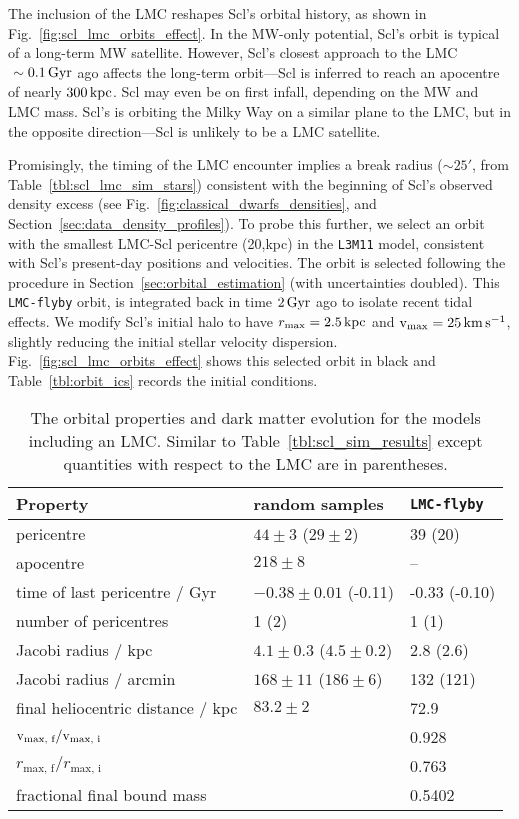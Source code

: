 The inclusion of the LMC reshapes Scl's orbital history, as shown in
Fig.~\ref{fig:scl_lmc_orbits_effect}. In the MW-only potential, Scl's
orbit is typical of a long-term MW satellite. However, Scl's closest
approach to the LMC \(~\sim0.1\,{\rm Gyr}\) ago affects the long-term
orbit---Scl is inferred to reach an apocentre of nearly \(300\,{\rm kpc}\).
Scl may even be on first infall, depending on the MW and LMC mass. Scl's
is orbiting the Milky Way on a similar plane to the LMC, but in the
opposite direction---Scl is unlikely to be a LMC satellite.

Promisingly, the timing of the LMC encounter implies a break radius
(\(\sim 25'\), from Table~\ref{tbl:scl_lmc_sim_stars}) consistent with
the beginning of Scl's observed density excess (see
Fig.~\ref{fig:classical_dwarfs_densities}, and
Section~\ref{sec:data_density_profiles}). To probe this further, we
select an orbit with the smallest LMC-Scl pericentre (20,kpc) in the
\texttt{L3M11} model, consistent with Scl's present-day positions and
velocities. The orbit is selected following the procedure in
Section~\ref{sec:orbital_estimation} (with uncertainties doubled). This
\texttt{LMC-flyby} orbit, is integrated back in time \(2\,{\rm Gyr}\) ago to
isolate recent tidal effects. We modify Scl's initial halo to have
\(r_{\rm max} = 2.5\,{\rm kpc}\) and \({\rm v}_{\rm max} = 25\,{\rm km\,s^{-1}}\), slightly reducing the
initial stellar velocity dispersion.
Fig.~\ref{fig:scl_lmc_orbits_effect} shows this selected orbit in black
and Table~\ref{tbl:orbit_ics} records the initial conditions.

\begin{table*}[t]
\centering
\caption[Orbits and results for Scl in the LMC potential.]{The orbital properties and dark matter evolution for the models including an LMC. Similar to Table \ref{tbl:scl_sim_results} except quantities with respect to the LMC are in parentheses. }
\label{tbl:scl_lmc_sims}
\begin{tabular}{lll}
\toprule
Property & random samples & \texttt{LMC-flyby}\\
\midrule
pericentre & $44\pm 3$ ($29 \pm 2$) & 39 (20)\\
apocentre & $218 \pm 8$ & –\\
time of last pericentre / Gyr & $-0.38\pm0.01$ (-0.11) & -0.33 (-0.10)\\
number of pericentres & 1 (2) & 1 (1)\\
Jacobi radius / kpc & $4.1\pm0.3$ ($4.5\pm0.2$) & 2.8 (2.6)\\
Jacobi radius / arcmin & $168 \pm 11$ ($186\pm6$) & 132 (121)\\
final heliocentric distance / kpc & $83.2\pm2$ & 72.9\\
${\rm v}_\textrm{max, f} / {\rm v}_\textrm{max, i}$ &  & 0.928\\
$r_\textrm{max, f} / r_\textrm{max, i}$ &  & 0.763\\
fractional final bound mass &  & 0.5402\\
\bottomrule
\end{tabular}
\end{table*}

